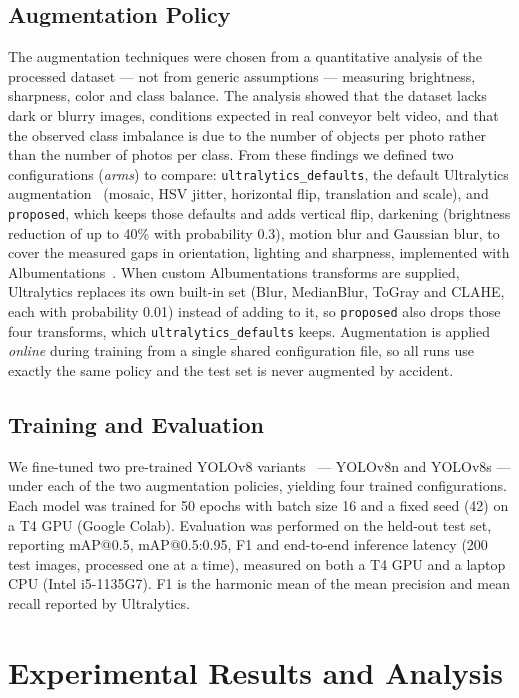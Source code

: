 \documentclass[conference]{IEEEtran}
\begin{document}
\subsection{Augmentation Policy}

The augmentation techniques were chosen from a quantitative analysis of the processed dataset
--- not from generic assumptions --- measuring brightness, sharpness, color and class balance.
The analysis showed that the dataset lacks dark or blurry images, conditions expected in real
conveyor belt video, and that the observed class imbalance is due to the number of objects per
photo rather than the number of photos per class. From these findings we defined two
configurations (\emph{arms}) to compare: \texttt{ultralytics\_defaults}, the default
Ultralytics augmentation~\cite{ultralytics2023} (mosaic, HSV jitter, horizontal flip,
translation and scale), and \texttt{proposed}, which keeps those defaults and adds vertical
flip, darkening (brightness reduction of up to 40\% with probability 0.3), motion blur and
Gaussian blur, to cover the measured gaps in orientation, lighting and sharpness, implemented
with Albumentations~\cite{buslaev2020}. When custom Albumentations transforms are supplied,
Ultralytics replaces its own built-in set (Blur, MedianBlur, ToGray and CLAHE, each with
probability 0.01) instead of adding to it, so \texttt{proposed} also drops those four
transforms, which \texttt{ultralytics\_defaults} keeps. Augmentation is applied \emph{online} during training from
a single shared configuration file, so all runs use exactly the same policy and the test set
is never augmented by accident.

\subsection{Training and Evaluation}

We fine-tuned two pre-trained YOLOv8 variants~\cite{ultralytics2023} --- YOLOv8n and YOLOv8s
--- under each of the two augmentation policies, yielding four trained configurations. Each
model was trained for 50 epochs with batch size 16 and a fixed seed (42) on a T4 GPU (Google
Colab). Evaluation was performed on the held-out test set, reporting mAP@0.5, mAP@0.5:0.95, F1
and end-to-end inference latency (200 test images, processed one at a time), measured on both
a T4 GPU and a laptop CPU (Intel i5-1135G7). F1 is the harmonic mean of the mean precision and
mean recall reported by Ultralytics.

\section{Experimental Results and Analysis}
\end{document}
